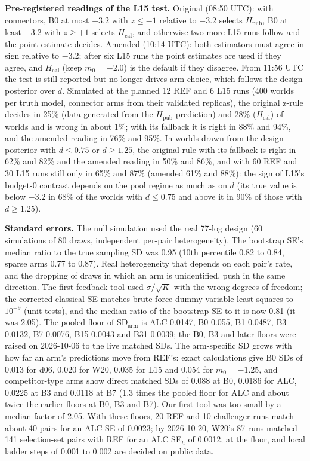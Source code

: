 \documentclass[
]{article}
\begin{document}
\textbf{Pre-registered readings of the L15 test.} Original (08:50 UTC):
with connectors, B0 at most \(-3.2\) with \(z \le -1\) relative to
\(-3.2\) selects \(H_{\mathrm{pub}}\), B0 at least \(-3.2\) with
\(z \ge +1\) selects \(H_{\mathrm{cal}}\), and otherwise two more L15
runs follow and the point estimate decides. Amended (10:14 UTC): both
estimators must agree in sign relative to \(-3.2\); after six L15 runs
the point estimates are used if they agree, and \(H_{\mathrm{cal}}\)
(keep \(m_0 = -2.0\)) is the default if they disagree. From 11:56 UTC
the test is still reported but no longer drives arm choice, which
follows the design posterior over \(d\). Simulated at the planned 12 REF
and 6 L15 runs (400 worlds per truth model, connector arms from their
validated replicas), the original z-rule decides in 25\% (data generated
from the \(H_{\mathrm{pub}}\) prediction) and 28\%
(\(H_{\mathrm{cal}}\)) of worlds and is wrong in about 1\%; with its
fallback it is right in 88\% and 94\%, and the amended reading in 76\%
and 95\%. In worlds drawn from the design posterior with \(d \le 0.75\)
or \(d \ge 1.25\), the original rule with its fallback is right in 62\%
and 82\% and the amended reading in 50\% and 86\%, and with 60 REF and
30 L15 runs still only in 65\% and 87\% (amended 61\% and 88\%): the
sign of L15's budget-0 contrast depends on the pool regime as much as on
\(d\) (its true value is below \(-3.2\) in 68\% of the worlds with
\(d \le 0.75\) and above it in 90\% of those with \(d \ge 1.25\)).

\textbf{Standard errors.} The null simulation used the real 77-log
design (60 simulations of 80 draws, independent per-pair heterogeneity).
The bootstrap SE's median ratio to the true sampling SD was 0.95 (10th
percentile 0.82 to 0.84, sparse arms 0.77 to 0.87). Real heterogeneity
that depends on each pair's rate, and the dropping of draws in which an
arm is unidentified, push in the same direction. The first feedback tool
used \(\sigma/\sqrt{K}\) with the wrong degrees of freedom; the
corrected classical SE matches brute-force dummy-variable least squares
to \(10^{-9}\) (unit tests), and the median ratio of the bootstrap SE to
it is now 0.81 (it was 2.05). The pooled floor of
\(\mathrm{SD}_{\mathrm{arm}}\) is ALC 0.0147, B0 0.055, B1 0.0487, B3
0.0132, B7 0.0076, B15 0.0043 and B31 0.0039; the B0, B3 and later
floors were raised on 2026-10-06 to the live matched SDs. The
arm-specific SD grows with how far an arm's predictions move from REF's:
exact calculations give B0 SDs of 0.013 for d06, 0.020 for W20, 0.035
for L15 and 0.054 for \(m_0 = -1.25\), and competitor-type arms show
direct matched SDs of 0.088 at B0, 0.0186 for ALC, 0.0225 at B3 and
0.0118 at B7 (1.3 times the pooled floor for ALC and about twice the
earlier floors at B0, B3 and B7). Our first tool was too small by a
median factor of 2.05. With these floors, 20 REF and 10 challenger runs
match about 40 pairs for an ALC SE of 0.0023; by 2026-10-20, W20's 87
runs matched 141 selection-set pairs with REF for an ALC SE\(_h\) of
0.0012, at the floor, and local ladder steps of 0.001 to 0.002 are
decided on public data.
\end{document}
